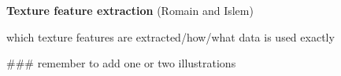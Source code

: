 \textbf{Texture feature extraction} (Romain and Islem)

which texture features are extracted/how/what data is used exactly

### remember to add one or two illustrations 